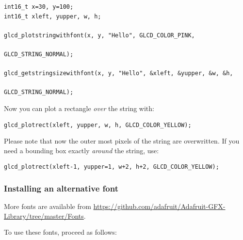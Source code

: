 \documentclass[12pt]{article}
\begin{document}
\begin{lstlisting}
int16_t x=30, y=100;
int16_t xleft, yupper, w, h;

glcd_plotstringwithfont(x, y, "Hello", GLCD_COLOR_PINK,
                                                   GLCD_STRING_NORMAL);

glcd_getstringsizewithfont(x, y, "Hello", &xleft, &yupper, &w, &h,
                                                   GLCD_STRING_NORMAL);
\end{lstlisting}

Now you can plot a rectangle \textsl{over} the string with:

\begin{lstlisting}
glcd_plotrect(xleft, yupper, w, h, GLCD_COLOR_YELLOW);
\end{lstlisting}

Please note that now the outer most pixels of the string are overwritten. If you need a bounding box exactly \textsl{around} the string, use:

\begin{lstlisting}
glcd_plotrect(xleft-1, yupper=1, w+2, h+2, GLCD_COLOR_YELLOW);
\end{lstlisting}


\subsubsection{Installing an alternative font}
More fonts are available from \url{https://github.com/adafruit/Adafruit-GFX-Library/tree/master/Fonts}.

To use these fonts, proceed as follows:
\end{document}
